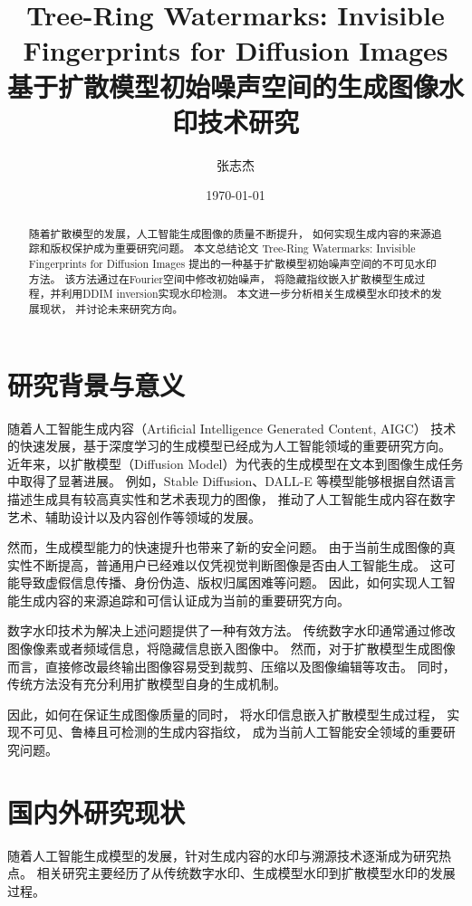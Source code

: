 \documentclass[12pt,a4paper]{article}
\title{
Tree-Ring Watermarks: Invisible Fingerprints for Diffusion Images\\
基于扩散模型初始噪声空间的生成图像水印技术研究
}
\author{张志杰}
\date{\today}
\begin{document}
\maketitle


\begin{abstract}

随着扩散模型的发展，人工智能生成图像的质量不断提升，
如何实现生成内容的来源追踪和版权保护成为重要研究问题。
本文总结论文
Tree-Ring Watermarks: Invisible Fingerprints for Diffusion Images
提出的一种基于扩散模型初始噪声空间的不可见水印方法。
该方法通过在Fourier空间中修改初始噪声，
将隐藏指纹嵌入扩散模型生成过程，并利用DDIM inversion实现水印检测。
本文进一步分析相关生成模型水印技术的发展现状，
并讨论未来研究方向。

\end{abstract}


\section{研究背景与意义}

随着人工智能生成内容（Artificial Intelligence Generated Content, AIGC）
技术的快速发展，基于深度学习的生成模型已经成为人工智能领域的重要研究方向。
近年来，以扩散模型（Diffusion Model）为代表的生成模型在文本到图像生成任务中取得了显著进展。
例如，Stable Diffusion、DALL-E 等模型能够根据自然语言描述生成具有较高真实性和艺术表现力的图像，
推动了人工智能生成内容在数字艺术、辅助设计以及内容创作等领域的发展。


然而，生成模型能力的快速提升也带来了新的安全问题。
由于当前生成图像的真实性不断提高，普通用户已经难以仅凭视觉判断图像是否由人工智能生成。
这可能导致虚假信息传播、身份伪造、版权归属困难等问题。
因此，如何实现人工智能生成内容的来源追踪和可信认证成为当前的重要研究方向。


数字水印技术为解决上述问题提供了一种有效方法。
传统数字水印通常通过修改图像像素或者频域信息，将隐藏信息嵌入图像中。
然而，对于扩散模型生成图像而言，直接修改最终输出图像容易受到裁剪、压缩以及图像编辑等攻击。
同时，传统方法没有充分利用扩散模型自身的生成机制。


因此，如何在保证生成图像质量的同时，
将水印信息嵌入扩散模型生成过程，
实现不可见、鲁棒且可检测的生成内容指纹，
成为当前人工智能安全领域的重要研究问题。

\section{国内外研究现状}

随着人工智能生成模型的发展，针对生成内容的水印与溯源技术逐渐成为研究热点。
相关研究主要经历了从传统数字水印、生成模型水印到扩散模型水印的发展过程。
\end{document}
